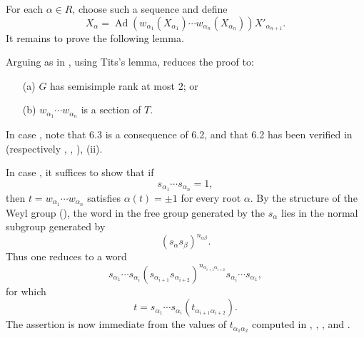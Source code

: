 For each \(\alpha\in R\), choose such a sequence and define
\[
 X_\alpha=
 \operatorname{Ad}\!\left(
  w_{\alpha_1}(X_{\alpha_1})\cdots
  w_{\alpha_n}(X_{\alpha_n})\right)X'_{\alpha_{n+1}}.
\]
It remains to prove the following lemma.


Arguing as in , using Tits's lemma, reduces the proof to:
\begin{enumerate}
  \item[\SGAInlineRefTarget{sga3:XXIII:6.3:item:a}(a)] \(G\) has semisimple rank at most \(2\); or
  \item[\SGAInlineRefTarget{sga3:XXIII:6.3:item:b}(b)] \(w_{\alpha_1}\cdots w_{\alpha_n}\) is a section of
    \(T\).
\end{enumerate}
In case , note that 6.3 is a consequence of 6.2, and that 6.2 has
been verified in  (respectively , ,
), (ii).

In case , it suffices to show that if
\[
  s_{\alpha_1}\cdots s_{\alpha_n}=1,
\]
then \(t=w_{\alpha_1}\cdots w_{\alpha_n}\) satisfies
\(\alpha(t)=\pm1\) for every root \(\alpha\). By the structure of the
Weyl group (), the word in the free group generated by the
\(s_\alpha\) lies in the normal subgroup generated by
\[
  (s_\alpha s_\beta)^{n_{\alpha\beta}}.
\]
Thus one reduces to a word
\[
 s_{\alpha_1}\cdots s_{\alpha_i}
 (s_{\alpha_{i+1}}s_{\alpha_{i+2}})
 ^{n_{\alpha_{i+1}\alpha_{i+2}}}
 s_{\alpha_i}\cdots s_{\alpha_1},
\]
for which
\[
  t=s_{\alpha_1}\cdots s_{\alpha_i}
      (t_{\alpha_{i+1}\alpha_{i+2}}).
\]
The assertion is now immediate from the values of
\(t_{\alpha_1\alpha_2}\) computed in , ,
, and .

